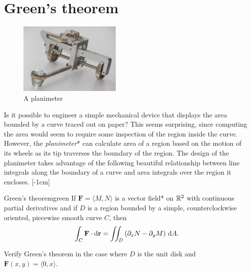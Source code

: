 \documentclass{watsonbook}
\begin{document}
\section{Green's theorem} \label{sec:greens}


\begin{figure}
  \includegraphics[width=5cm]{figures/planimeter}
  \caption{A planimeter \label{fig:planimeter}}
\end{figure}

Is it possible to engineer a simple mechanical device that displays
the area bounded by a curve traced out on paper? This seems
surprising, since computing the area would seem to require some
inspection of the region inside the curve. However, the
\textit{planimeter}* can calculate area of a region based on the
motion of its wheels as its tip traverses the boundary of the region. The
design of the planimeter takes advantage of the following beautiful
relationship between line integrals along the boundary of a curve and
area integrals over the region it encloses. [-1cm]

\begin{theo}{Green's theorem}{green}
  If $\mathbf{F} = \langle M, N\rangle$ is a vector field* on $\mathbb{R}^2$
  with continuous partial derivatives and if $D$ is a region bounded by a
  simple, counterclockwise oriented, piecewise smooth curve $C$, then
  \[
    \int_C \mathbf{F} \cdot \mathrm{d}\mathbf{r} = \iint_D \left(\partial_x N -
      \partial_y M \right) \, {\mathrm{d}}A. 
  \]
\end{theo}

\begin{example}{}{}
  Verify Green's theorem in the case where $D$ is the unit disk and
  $\mathbf{F}(x,y)= \langle 0, x \rangle$. 
\end{example}
\end{document}

